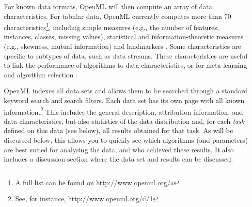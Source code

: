 \documentclass{acmproc-sp}
\begin{document}
For known data formats, OpenML will then compute an array of  data characteristics. For tabular data, OpenML currently computes more than 70 characteristics\footnote{A full list can be found on http://www.openml.org/a}, including simple measures (e.g., the number of features, instances, classes, missing values), statistical and information-theoretic measures (e.g., skewness, mutual information) and landmarkers \cite{Pfahringer:2000p553}. Some characteristics are specific to subtypes of data, such as data streams. These characteristics are useful to link the performance of algorithms to data characteristics, or for meta-learning \cite{Vanschoren12} and algorithm selection \cite{LeiteBV12}.

OpenML indexes all data sets and allows them to be searched through a standard keyword search and search filters. Each data set has its own page with all known information.\footnote{See, for instance, http://www.openml.org/d/1} This includes the general description, attribution information, and data characteristics, but also statistics of the data distribution and, for each \emph{task} defined on this data (see below), all results obtained for that task. As will be discussed below, this allows you to quickly see which algorithms (and parameters) are best suited for analysing the data, and who achieved these results. It also includes a discussion section where the data set and results can be discussed.
\end{document}
